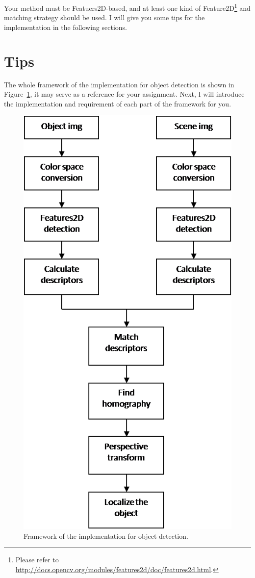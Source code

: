 \documentclass[12pt]{article}
\begin{document}
Your method must be Featuers2D-based, and at least one kind of Feature2D\footnote{Please refer to \url{http://docs.opencv.org/modules/features2d/doc/features2d.html}.} and matching strategy should be used. I will give you some tips for the implementation in the following sections.

\section{Tips}

The whole framework of the implementation for object detection is shown in Figure~\ref{fig:framework}, it may serve as a reference for your assignment. Next, I will introduce the implementation and requirement of each part of the framework for you.

\begin{figure}[!ht]
\centering
\includegraphics[height=0.6\textheight]{framework.png}
\caption{Framework of the implementation for object detection.}
\label{fig:framework}
\end{figure}
\end{document}

